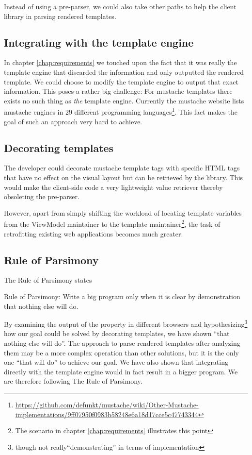 \documentclass[thesis.tex]{subfiles}
\begin{document}
Instead of using a pre-parser, we could also take other paths to help
the client library in parsing rendered templates.

\subsection{Integrating with the template engine}

In chapter \ref{chap:requirements} we touched upon the fact that it was really
the template engine that discarded the information and only outputted the
rendered template. We could choose to modify the template engine to output that
exact information. This poses a rather big challenge:
For mustache templates there exists no such thing as \emph{the} template engine.
Currently the mustache website lists mustache engines in 29 different
programming languages\footnote{\url{https://github.com/defunkt/mustache/wiki/Other-Mustache-implementations/9ff07950f0983b58248e6a18d17cce5c47743344}}.
This fact makes the goal of such an approach very hard to achieve.

\subsection{Decorating templates}

The developer could decorate mustache template tags with specific HTML tags that
have no effect on the visual layout but can be retrieved by the library.
This would make the client-side code a very lightweight value retriever
thereby obsoleting the pre-parser.

However, apart from simply shifting the workload of locating template variables
from the ViewModel maintainer to the template maintainer\footnote{The scenario
in chapter \ref{chap:requirements} illustrates this point},
the task of retrofitting existing web applications becomes much greater.

\subsection{Rule of Parsimony}
\label{sec:parsimony}
The Rule of Parsimony states
\begin{citequote}{\cite[Chapter 1]{UXART}}
Rule of Parsimony: Write a big program only when it is clear by demonstration
that nothing else will do.
\end{citequote}

By examining the output of the  property in different browsers
and hypothesizing\footnote{though not really``demonstrating'' in terms of
implementation} how our goal could be solved by decorating templates,
we have shown ``that nothing else will do''.
The approach to parse rendered templates after analyzing them may be a
more complex operation than other solutions, but it is the only one
``that will do'' to achieve our goal. We have also shown that integrating
directly with the template engine would in fact result in a bigger program.
We are therefore following The Rule of Parsimony.
\end{document}
